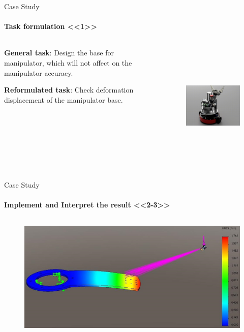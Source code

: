 \documentclass[aspectratio=169]{beamer}
\begin{document}
\begin{frame}[t]{Case Study}
\framesubtitle{Task formulation <<1>>}
    \begin{columns}[T,onlytextwidth]
        \begin{column}{0.49\textwidth}
            \textbf{General task}: Design the base for manipulator, which will not affect on the manipulator accuracy.
            \medskip

            \textbf{Reformulated task}: Check deformation displacement of the manipulator base.
        \end{column}
        \begin{column}{0.49\textwidth}
            \vspace{-0.6cm}
            \begin{figure}[H]
                \href{https://gifyu.com/image/S7HqU}{
                    \centering\includegraphics[height=6cm,width=1\textwidth,keepaspectratio]{eurobot_robot_pic.png}}
                \label{fig:eurobot_robot_pic.png}
            \end{figure}
        \end{column}
    \end{columns}
\end{frame}



\begin{frame}[t]{Case Study}
\framesubtitle{Implement and Interpret the result <<2-3>>}
    \vspace{-0.6cm}
    \begin{figure}[H]
        \centering\includegraphics[height=6cm,width=1\textwidth,keepaspectratio]{cae_ex4.jpg}
        \label{fig:cae_ex4.jpg}
    \end{figure}
\end{frame}
\end{document}
